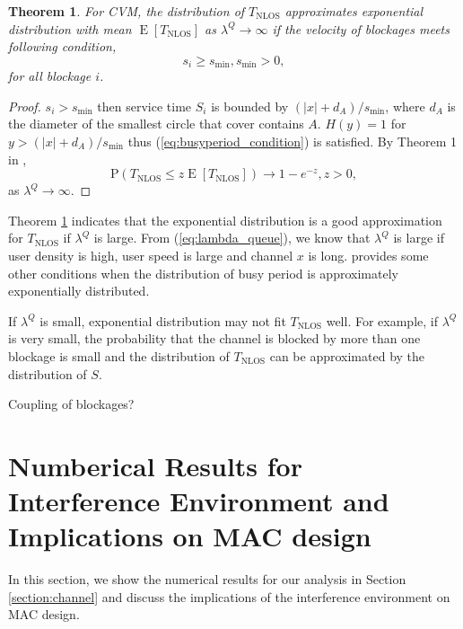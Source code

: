 \documentclass[10pt, conference, letterpaper]{IEEEtran}
\newtheorem{theorem}{Theorem}
\DeclareMathOperator*{\E}{\mathrm{E}}
\DeclareMathOperator*{\NLOS}{\mathrm{NLOS}}
\begin{document}
\begin{theorem}\label{theorem:T_NLOS_exp}
For CVM, the distribution of $T_{\NLOS}$ approximates exponential distribution with mean $\E[T_{\NLOS}]$ as $\lambda^Q\rightarrow \infty$ if the velocity of blockages meets following condition,
\begin{equation}\label{condition:T_NLOS_exp}
s_i\geq s_{\min}, s_{\min}>0,
\end{equation} 
for all blockage $i$.
\end{theorem}

\begin{proof}
$s_i>s_{\min}$ then service time $S_i$ is bounded by $(|x|+d_A)/s_{\min}$, where $d_A$ is the diameter of the smallest circle that cover contains $A$. $H(y) = 1$ for $y>(|x|+d_A)/s_{\min}$ thus (\ref{eq:busyperiod_condition}) is satisfied. By Theorem 1 in \cite{busyperiod_heavytraffic}, 
\begin{equation*}
\mathrm{P}(T_{\NLOS} \leq z\E[T_{\NLOS}]) \rightarrow 1-e^{-z}, z>0,
\end{equation*} 
as $\lambda^Q\rightarrow \infty$.
\end{proof}

Theorem \ref{theorem:T_NLOS_exp} indicates that the exponential distribution is a good approximation for $T_{\NLOS}$ if $\lambda^Q$ is large. From (\ref{eq:lambda_queue}), we know that $\lambda^Q$ is large if user density is high, user speed is large and channel $x$ is long. \cite{busyperiod_exponential} provides some other conditions when the distribution of busy period is approximately exponentially distributed.
 
If $\lambda^Q$ is small, exponential distribution may not fit $T_{\NLOS}$ well. For example, if $\lambda^Q$ is very small, the probability that the channel is blocked by more than one blockage is small and the distribution of $T_{\NLOS}$ can be approximated by the distribution of $S$.

Coupling of blockages?


\section{Numberical Results for Interference Environment and Implications on MAC design} \label{section:channel_numerical}
In this section, we show the numerical results for our analysis in Section \ref{section:channel} and discuss the implications of the interference environment on MAC design. 
\end{document}
